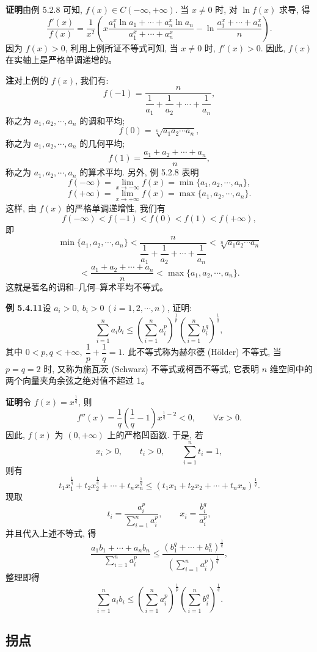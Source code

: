 \documentclass[UTF8,12pt,a4paper,fontset=fandol]{ctexart}
\begin{document}
\noindent\textbf{证明}\quad 由例 5.2.8 可知, $f(x)\in C(-\infty,+\infty)$. 当 $x\ne0$ 时, 对 $\ln f(x)$ 求导, 得
\[
  \frac{f'(x)}{f(x)}
  =\frac1{x^2}\left(
  x\frac{a_1^x\ln a_1+\cdots+a_n^x\ln a_n}{a_1^x+\cdots+a_n^x}
  -\ln\frac{a_1^x+\cdots+a_n^x}{n}\right).
\]
因为 $f(x)>0$, 利用上例所证不等式可知, 当 $x\ne0$ 时, $f'(x)>0$. 因此, $f(x)$ 在实轴上是严格单调递增的。

\noindent\textbf{注}\quad 对上例的 $f(x)$, 我们有:
\[
  f(-1)=\frac{n}{\dfrac1{a_1}+\dfrac1{a_2}+\cdots+\dfrac1{a_n}},
\]
称之为 $a_1,a_2,\cdots,a_n$ 的调和平均;
\[
  f(0)=\sqrt[n]{a_1a_2\cdots a_n},
\]
称之为 $a_1,a_2,\cdots,a_n$ 的几何平均;
\[
  f(1)=\frac{a_1+a_2+\cdots+a_n}{n},
\]
称之为 $a_1,a_2,\cdots,a_n$ 的算术平均. 另外, 例 5.2.8 表明
\[
  f(-\infty)=\lim_{x\to-\infty}f(x)=\min\{a_1,a_2,\cdots,a_n\},
\]
\[
  f(+\infty)=\lim_{x\to+\infty}f(x)=\max\{a_1,a_2,\cdots,a_n\}.
\]
这样, 由 $f(x)$ 的严格单调递增性, 我们有
\[
  f(-\infty)<f(-1)<f(0)<f(1)<f(+\infty),
\]
即
\[
  \min\{a_1,a_2,\cdots,a_n\}
  <\frac{n}{\dfrac1{a_1}+\dfrac1{a_2}+\cdots+\dfrac1{a_n}}
  <\sqrt[n]{a_1a_2\cdots a_n}
\]
\[
  <\frac{a_1+a_2+\cdots+a_n}{n}
  <\max\{a_1,a_2,\cdots,a_n\}.
\]
这就是著名的调和--几何--算术平均不等式。

\noindent\textbf{例 5.4.11}\quad 设 $a_i>0,\ b_i>0\ (i=1,2,\cdots,n)$, 证明:
\[
  \sum_{i=1}^n a_i b_i
  \leqslant
  \left(\sum_{i=1}^n a_i^p\right)^{\frac1p}
  \left(\sum_{i=1}^n b_i^q\right)^{\frac1q},
\]
其中 $0<p,q<+\infty,\ \dfrac1p+\dfrac1q=1$. 此不等式称为赫尔德 (H\"older) 不等式, 当 $p=q=2$ 时, 又称为施瓦茨 (Schwarz) 不等式或柯西不等式, 它表明 $n$ 维空间中的两个向量夹角余弦之绝对值不超过 1。

\noindent\textbf{证明}\quad 令 $f(x)=x^{\frac1q}$, 则
\[
  f''(x)=\frac1q\left(\frac1q-1\right)x^{\frac1q-2}<0,\qquad \forall x>0.
\]
因此, $f(x)$ 为 $(0,+\infty)$ 上的严格凹函数. 于是, 若
\[
  x_i>0,\qquad t_i>0,\qquad \sum_{i=1}^n t_i=1,
\]
则有
\[
  t_1x_1^{\frac1q}+t_2x_2^{\frac1q}+\cdots+t_nx_n^{\frac1q}
  \leqslant (t_1x_1+t_2x_2+\cdots+t_nx_n)^{\frac1q}.
\]
现取
\[
  t_i=\frac{a_i^p}{\sum_{i=1}^n a_i^p},\qquad x_i=\frac{b_i^q}{a_i^p},
\]
并且代入上述不等式, 得
\[
  \frac{a_1b_1+\cdots+a_nb_n}{\sum_{i=1}^n a_i^p}
  \leqslant
  \frac{(b_1^q+\cdots+b_n^q)^{\frac1q}}{\left(\sum_{i=1}^n a_i^p\right)^{\frac1q}},
\]
整理即得
\[
  \sum_{i=1}^n a_i b_i
  \leqslant
  \left(\sum_{i=1}^n a_i^p\right)^{\frac1p}
  \left(\sum_{i=1}^n b_i^q\right)^{\frac1q}.
\]

\subsection{拐点}
\end{document}
